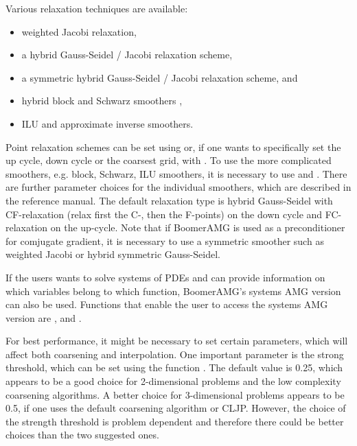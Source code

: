 Various relaxation techniques are available:
\begin{itemize}
\item weighted Jacobi relaxation,
\item a hybrid Gauss-Seidel / Jacobi relaxation scheme, 
\item a symmetric hybrid Gauss-Seidel / Jacobi relaxation scheme, and
\item hybrid block and Schwarz smoothers \cite{UMYang_2004},
\item ILU and approximate inverse smoothers.
\end{itemize}
Point relaxation schemes can be set using  or, if
one wants to specifically set the up cycle, down cycle or the coarsest grid, with 
. To use the more complicated smoothers,
e.g. block, Schwarz, ILU smoothers, it is necessary to use 
and . There are further parameter choices for the
individual smoothers, which are described in the reference manual.
The default relaxation type is hybrid Gauss-Seidel with CF-relaxation (relax first the C-,
then the F-points) on the down cycle and FC-relaxation on the up-cycle. Note that if
BoomerAMG is used as a preconditioner for comjugate gradient, it is necessary to use
a symmetric smoother such as weighted Jacobi or hybrid symmetric Gauss-Seidel.

 
If the users wants to solve systems of PDEs and can provide information on
which variables belong to which function, BoomerAMG's systems AMG version
can also be used. Functions that enable the user to access the systems AMG version 
are , 
and .

For best performance, it might be necessary to set certain parameters, which will
affect both coarsening and interpolation.
One important parameter is the strong threshold, which can be set
using the function .
The default value is 0.25, which appears to be a good choice for 2-dimensional
problems and the low complexity coarsening algorithms. 
A better choice for 3-dimensional problems appears to be 0.5, if one uses the
default coarsening algorithm or CLJP. However,
the choice of the strength threshold is problem dependent and therefore
there could be better choices than the two suggested ones.


